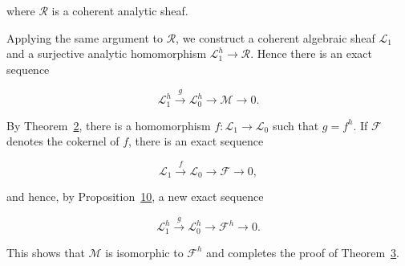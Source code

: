 where $\mathcal{R}$ is a coherent analytic sheaf.

Applying the same argument to $\mathcal{R}$, we construct a coherent algebraic sheaf $\mathcal{L}_1$ and a surjective analytic homomorphism $\mathcal{L}_1^h\to\mathcal{R}$. Hence there is an exact sequence

\begin{equation*}
\mathcal{L}_1^h\xrightarrow{g}\mathcal{L}_0^h
\longrightarrow\mathcal{M}\longrightarrow0.
\end{equation*}

By Theorem~\hyperref[gaga:thm:2]{2}, there is a homomorphism $f:\mathcal{L}_1\to\mathcal{L}_0$ such that $g=f^h$. If $\mathcal{F}$ denotes the cokernel of $f$, there is an exact sequence

\begin{equation*}
\mathcal{L}_1\xrightarrow{f}\mathcal{L}_0
\longrightarrow\mathcal{F}\longrightarrow0,
\end{equation*}

and hence, by Proposition~\hyperref[gaga:prop:10]{10}, a new exact sequence

\begin{equation*}
\mathcal{L}_1^h\xrightarrow{g}\mathcal{L}_0^h
\longrightarrow\mathcal{F}^h\longrightarrow0.
\end{equation*}

This shows that $\mathcal{M}$ is isomorphic to $\mathcal{F}^h$ and completes the proof of Theorem~\hyperref[gaga:thm:3]{3}.
